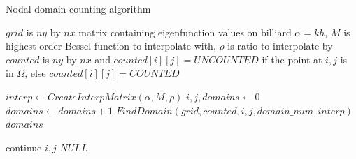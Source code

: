 \documentclass{report}
\begin{document}
\begin{algorithm}
  \caption{Nodal domain counting algorithm}
  \begin{algorithmic}
    \Require $grid$ is $ny$ by $nx$ matrix containing eigenfunction values on billiard
    \Require $\alpha = k h$, $M$ is highest order Bessel function to interpolate with, $\rho$ is ratio to interpolate by
    \Require $counted$ is $ny$ by $nx$ and $counted[i][j] = UNCOUNTED$ if the point at $i,j$ is in $\Omega$, else $counted[i][j] = COUNTED$

    \item[]
        \State $interp \gets CreateInterpMatrix(\alpha, M, \rho)$
        \State $i,j,domains \gets 0$
            \State $domains \gets domains + 1$
            \State $FindDomain(grid, counted, i, j, domain\_num, interp)$
        \EndWhile \\
        \Return $domains$
    \EndFunction

    \item[]
                    \State continue
                \EndIf
                    \State \Return $i,j$
                \EndIf
            \EndFor
        \EndFor
        \State \Return $NULL$
    \EndFunction
  \end{algorithmic}
\end{algorithm}
\end{document}
